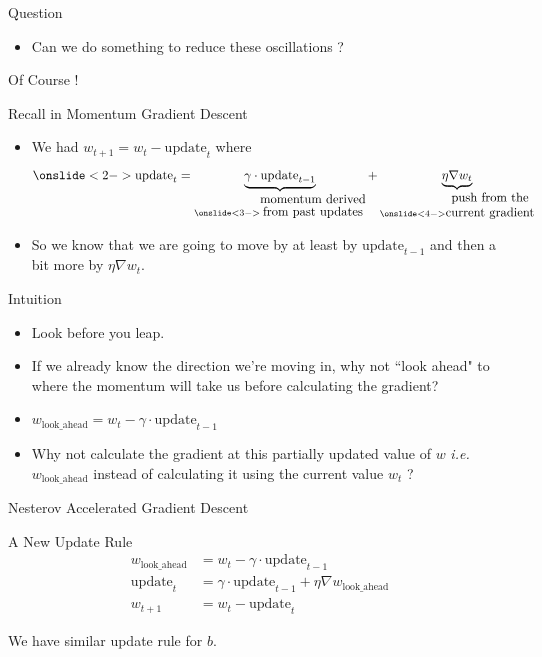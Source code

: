 \documentclass[10pt, aspectratio=169]{beamer}
\begin{document}
\begin{frame}
\begin{block}{Question}
\begin{itemize}
\item<1-> Can we do something to reduce these oscillations ?
\end{itemize}
\leftpointright \hspace{0.1cm} Of Course !
\end{block}
\end{frame}

\begin{frame}
\begin{block}{Recall in Momentum Gradient Descent}
\begin{itemize}
\item<1-> We had $w_{t+1} = w_t - \text{update}_t$ where
$$\onslide<2->{\text{update}_t = \underbrace{\gamma \cdot \text{update}_{t-1}}_{\onslide<3->{\shortstack{momentum derived \\ from past updates}}} + \underbrace{\eta \nabla w_t}_{\onslide<4->{\shortstack{push from the \\ current gradient}}}}$$
\item<5-> So we know that we are going to move by at least by $\text{update}_{t-1}$ and then a bit more by $\eta \nabla w_t$.
\end{itemize}
\end{block}
\end{frame}

\begin{frame}
\begin{block}{Intuition}
\begin{itemize}
\item<1-> Look before you leap.
\item<2-> If we already know the direction we’re moving in, why not ``look ahead" to where the momentum will take us before calculating the gradient?
\item<3-> $w_{\text{look\_ahead}} = w_t - \gamma \cdot \text{update}_{t-1}$
\item<4-> Why not calculate the gradient at this partially updated value
 of $w$ \textit{i.e.} $w_{\text{look\_ahead}}$ instead of calculating it using the current value $w_t$ ?
\end{itemize}
\end{block}
\end{frame}



\begin{frame}{Nesterov Accelerated Gradient Descent}
\begin{block}{A New Update Rule}
\begin{align*}
w_{\text{look\_ahead}} &= w_t - \gamma \cdot \text{update}_{t-1} \\
\text{update}_t &= \gamma \cdot \text{update}_{t-1} + \eta \nabla w_{\text{look\_ahead}} \\
w_{t+1} &= w_t - \text{update}_t
\end{align*}

We have similar update rule for $b$.
\end{block}
\end{frame}
\end{document}
